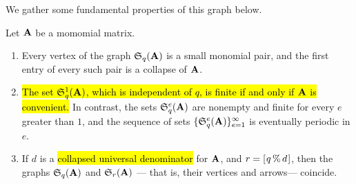 \documentclass{amsart}
\begin{document}
We gather some fundamental properties of this graph below.

\begin{proposition}
   \label{elementary1: P}
   Let $\mathbf{A}$ be a momomial matrix.
\begin{enumerate}[$(1)$]

\item \label{elementary1 small pairs} 
Every vertex of the graph $\mathfrak{S}_{q}(\mathbf{A})$ is a small monomial pair, and the first entry of every such pair is a collapse of $\mathbf{A}$. 

\item \label{elementary1 periodic in e}
\hl{The set $\mathfrak{S}_{q}^1(\mathbf{A})$, which is independent of $q$, is finite if and only if $\mathbf{A}$ is convenient.}  In contrast, the sets $\mathfrak{S}_{q}^e(\mathbf{A})$ are nonempty and finite for every $e$ greater than $1$, and the sequence of sets $\{ \mathfrak{S}_{q}^e(\mathbf{A}) \}_{e=1}^{\infty}$ is eventually periodic in $e$.

\item \label{elementary1 periodic in r}
If $d$ is a \hl{collapsed universal denominator} for $\mathbf{A}$, and $r= [ \hspace{.01in} q \, \% \, d \hspace{.01in} ]$, then the graphs $\mathfrak{S}_{q}(\mathbf{A})$ and $\mathfrak{S}_r(\mathbf{A})$ --- that is, their vertices {and} arrows--- coincide.
\end{enumerate}
\end{proposition}
\end{document}
